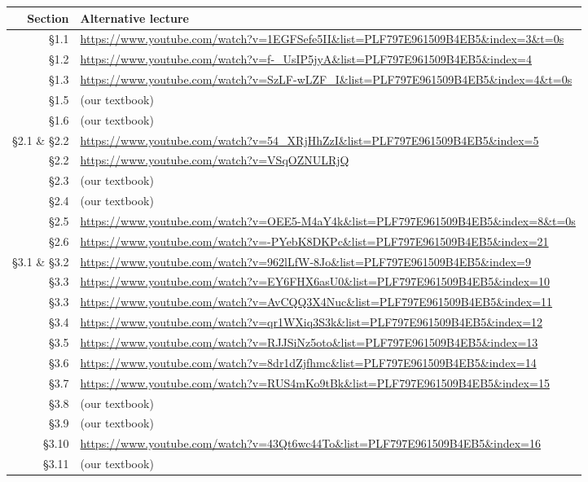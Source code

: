 \documentclass[12pt]{article}
\newcounter{ex}\setcounter{ex}{0}
\begin{document}
\begin{tabular} {|r| l |}
\hline
Section  & Alternative lecture \\ \hline

\S1.1   & \url{https://www.youtube.com/watch?v=1EGFSefe5II&list=PLF797E961509B4EB5&index=3&t=0s} \\
\S1.2  &  \url{https://www.youtube.com/watch?v=f-_UsIP5jyA&list=PLF797E961509B4EB5&index=4} \\
\S1.3  & \url{https://www.youtube.com/watch?v=SzLF-wLZF_I&list=PLF797E961509B4EB5&index=4&t=0s}\\
\S1.5  &  (our textbook)   \\
\S1.6   &   (our textbook)   \\


\S2.1 \& \S2.2  & \url{https://www.youtube.com/watch?v=54_XRjHhZzI&list=PLF797E961509B4EB5&index=5} \\ \hline
\S2.2  & \url{https://www.youtube.com/watch?v=VSqOZNULRjQ} \\ \hline
\S2.3  & (our textbook)   \\ \hline
\S2.4 &  (our textbook)   \\ \hline
\S2.5 &  \url{https://www.youtube.com/watch?v=OEE5-M4aY4k&list=PLF797E961509B4EB5&index=8&t=0s} \\ \hline
\S2.6 &   \url{https://www.youtube.com/watch?v=-PYebK8DKPc&list=PLF797E961509B4EB5&index=21}  \\ \hline

\S3.1 \& \S3.2  &   \url{https://www.youtube.com/watch?v=962lLfW-8Jo&list=PLF797E961509B4EB5&index=9} \\ \hline

\S3.3 & \url{https://www.youtube.com/watch?v=EY6FHX6asU0&list=PLF797E961509B4EB5&index=10} \\ \hline
\S3.3 & \url{https://www.youtube.com/watch?v=AvCQQ3X4Nuc&list=PLF797E961509B4EB5&index=11}  \\ \hline
\S3.4 & \url{https://www.youtube.com/watch?v=qr1WXiq3S3k&list=PLF797E961509B4EB5&index=12} \\ \hline
\S3.5 & \url{https://www.youtube.com/watch?v=RJJSiNz5oto&list=PLF797E961509B4EB5&index=13} \\ \hline
\S3.6 & \url{https://www.youtube.com/watch?v=8dr1dZjfhmc&list=PLF797E961509B4EB5&index=14} \\ \hline
\S3.7 & \url{https://www.youtube.com/watch?v=RUS4mKo9tBk&list=PLF797E961509B4EB5&index=15} \\ \hline
\S3.8 & (our textbook)   \\ \hline
\S3.9 &  (our textbook)  \\ \hline
\S3.10 & \url{https://www.youtube.com/watch?v=43Qt6wc44To&list=PLF797E961509B4EB5&index=16} \\ \hline
\S3.11 & (our textbook)   \\ \hline


\end{tabular}
\end{document}
